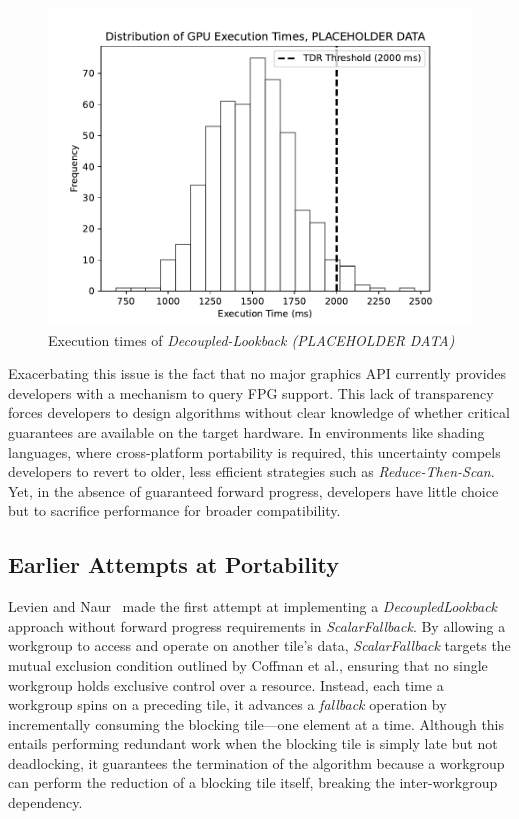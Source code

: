 \documentclass[sigconf]{acmart}
\begin{document}
\begin{figure}[h]
  \centering
  \includegraphics[width=\linewidth]{graphics/Figure_1.pdf}
  \caption{Execution times of \emph{Decoupled-Lookback (PLACEHOLDER DATA)}}
\end{figure}

Exacerbating this issue is the fact that no major graphics API currently provides developers with a mechanism to query FPG support. This lack of transparency forces developers to design algorithms without clear knowledge of whether critical guarantees are available on the target hardware. In environments like shading languages, where cross-platform portability is required, this uncertainty compels developers to revert to older, less efficient strategies such as \emph{Reduce-Then-Scan}. Yet, in the absence of guaranteed forward progress, developers have little choice but to sacrifice performance for broader compatibility.

\subsection{Earlier Attempts at Portability}
Levien and Naur~\cite{Raph2021} made the first attempt at implementing a \emph{DecoupledLookback} approach without forward progress requirements in \emph{ScalarFallback}. By allowing a workgroup to access and operate on another tile’s data, \emph{ScalarFallback} targets the mutual exclusion condition outlined by Coffman et al., ensuring that no single workgroup holds exclusive control over a resource. Instead, each time a workgroup spins on a preceding tile, it advances a \emph{fallback} operation by incrementally consuming the blocking tile---one element at a time. Although this entails performing redundant work when the blocking tile is simply late but not deadlocking, it guarantees the termination of the algorithm because a workgroup can perform the reduction of a blocking tile itself, breaking the inter-workgroup dependency.
\end{document}
